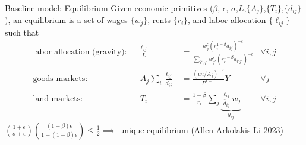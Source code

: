 \documentclass[11pt,notes=hide,aspectratio=169]{beamer}
\begin{document}
\begin{frame}{Baseline model: Equilibrium}
Given economic primitives ($\beta$, $\epsilon$, $\sigma$,$L$,$\{A_j\}$,$\{T_i\}$,$\{d_{ij}\}$),
an equilibrium is a set of wages $\{w_j\}$, rents $\{r_i\}$, and labor allocation $\{\ell_{ij}\}$
such that
\begin{align}
\text{labor allocation (gravity):}&&
\frac{\ell_{ij}}{L}
&=
\frac
{w_{j}^\epsilon \left(r_{i}^{1-\beta} d_{ij}\right)^{-\epsilon}}
{\sum_{i',j'}w_{j'}^\epsilon \left(r_{i'}^{1-\beta}  d_{i'j'}\right)^{-\epsilon}}
\label{eqn:cont_laborallocation}
&\forall i,j
\\
\text{goods markets:}&&
A_j \sum_i \frac{\ell_{ij}}{\bar{d}_{ij}} 
&=
\frac{\left({w_j}/{A_j}\right)^{-\sigma}}{P^{1-\sigma}} Y %
&\forall j
\label{eqn:tradeeqlbm:goodsmarketclearing}
\\
\text{land markets:}&&
T_i
&=
\frac{1-\beta}{r_i} \sum_j \underbrace{\frac{\ell_{ij}}{\bar{d}_{ij}} w_j}_{y_{ij}}
&\forall i,j
\label{eqn:tradeeqlbm:landsmarketclearing} 
\end{align}
$\left(\frac{1+\epsilon}{\sigma + \epsilon}\right) \left(\frac{(1-\beta) \epsilon}{1+(1-\beta) \epsilon}\right) \leq \frac{1}{2} \implies$ unique equilibrium (Allen Arkolakis Li 2023)
\end{frame}
\end{document}
